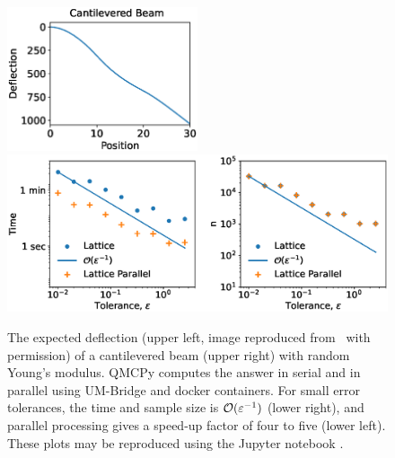 \documentclass[graybox]{svmult}
\begin{document}
\begin{figure}[t]
    \centering
    \includegraphics[width=0.5\textwidth]{cantileveredbeamwords.eps}
    \includegraphics[width=1\textwidth]{ldparallelbeam.eps}
    \caption{The expected deflection (upper left, image reproduced from~\cite{ParSee22a} with permission) of a cantilevered beam (upper right) with random Young's modulus.  QMCPy computes the answer in serial and in parallel using UM-Bridge and docker containers.  For small error tolerances, the time and sample size is ${\mathcal{O}}(\varepsilon^{-1})$ (lower right), and parallel processing gives a speed-up factor of four to five (lower left). These plots may be reproduced using the Jupyter notebook \cite{MCQMC2022Figs}.  }
    \label{CDHJSfigbeam}
\end{figure}
\end{document}
